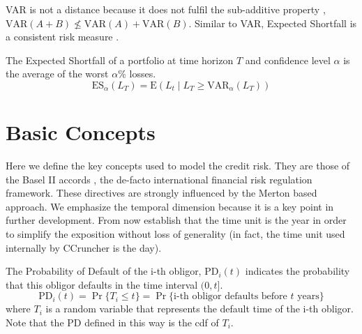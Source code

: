 \documentclass[11pt,fleqn]{book} %
\begin{document}
VAR is not a distance because it does not fulfil the sub-additive property 
\cite{var:varbad}, $\text{VAR}(A+B) \nleq \text{VAR}(A)+\text{VAR}(B)$. 
Similar to VAR, Expected Shortfall is a consistent risk measure 
\cite{var:eshortfall}.

\begin{definition}
	The Expected Shortfall of a portfolio at time horizon $T$ and 
	confidence level $\alpha$ is the average of the worst $\alpha\%$ losses.
	\begin{displaymath}
		\text{ES}_\alpha(L_T) = \text{E}(L_t \mid L_T \ge \text{VAR}_\alpha(L_T))
	\end{displaymath}
\end{definition}

\section{Basic Concepts}

Here we define the key concepts used to model the credit risk.
They are those of the Basel II accords \cite{basel2:2006}, the 
de-facto international financial risk regulation framework. These
directives are strongly influenced by the Merton based approach.
We emphasize the temporal dimension because it is a key point in 
further development. From now establish that the time unit is the 
year in order to simplify the exposition without loss of generality
(in fact, the time unit used internally by CCruncher is the day).

\begin{definition}
	The Probability of Default of the i-th obligor, $\text{PD}_i(t)$
	indicates the probability that this obligor defaults in the time 
	interval $(0,t]$.
	\begin{displaymath}
		\text{PD}_i(t) = \Pr\{T_i \le t\} = 
		\Pr\{\text{i-th obligor defaults before $t$ years}\}
	\end{displaymath}
	where $T_i$ is a random variable that represents the default
	time of the i-th obligor. Note that the PD defined in this way 
	is the cdf of $T_i$.
\end{definition}
\end{document}
